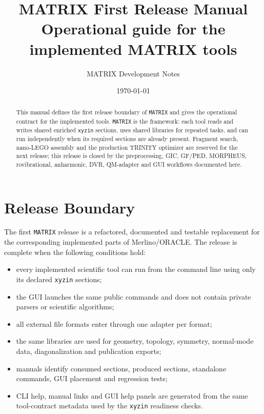 \documentclass[11pt]{article}
\title{\textbf{MATRIX First Release Manual}\\
\large Operational guide for the implemented MATRIX tools}
\author{MATRIX Development Notes}
\date{\today}
\newcommand{\framework}{\texttt{MATRIX}}
\newcommand{\xyzin}{\texttt{xyzin}}
\begin{document}
\maketitle

\begin{abstract}
This manual defines the first release boundary of \framework{} and gives the
operational contract for the implemented tools.  \framework{} is the framework:
each tool reads and writes shared enriched \xyzin{} sections, uses shared
libraries for repeated tasks, and can run independently when its required
sections are already present.  Fragment search, nano-LEGO assembly and the
production TRINITY optimizer are reserved for the next release; this release is
closed by the preprocessing, GIC, GF/PED, MORPHEUS, rovibrational, anharmonic,
DVR, QM-adapter and GUI workflows documented here.
\end{abstract}

\tableofcontents
\newpage

\section{Release Boundary}

The first \framework{} release is a refactored, documented and testable
replacement for the corresponding implemented parts of Merlino/ORACLE.  The
release is complete when the following conditions hold:

\begin{itemize}
  \item every implemented scientific tool can run from the command line using
        only its declared \xyzin{} sections;
  \item the GUI launches the same public commands and does not contain private
        parsers or scientific algorithms;
  \item all external file formats enter through one adapter per format;
  \item the same libraries are used for geometry, topology, symmetry,
        normal-mode data, diagonalization and publication exports;
  \item manuals identify consumed sections, produced sections, standalone
        commands, GUI placement and regression tests;
  \item CLI help, manual links and GUI help panels are generated from the same
        tool-contract metadata used by the \xyzin{} readiness checks.
\end{itemize}
\end{document}
